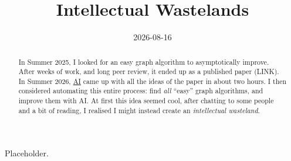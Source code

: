 \documentclass[11pt]{article}
\title{Intellectual Wastelands}
\date{2026-08-16}
\begin{document}
\begin{abstract}
In Summer 2025, I looked for an easy graph algorithm to asymptotically improve.
After weeks of work, and long peer review, it ended up as a published paper
(LINK).
In Summer 2026, \href{https://chatgpt.com/share/6a8434d4-c278-83ed-aeb1-f2f0cd1bdb62}{AI}
came up with all the ideas of the paper in about two hours. I then considered
automating this entire process: find \textit{all} ``easy'' graph algorithms,
and improve them with AI. At first this idea seemed cool, after chatting to
some people and a bit of reading, I realised I might instead create an
\textit{intellectual wasteland}.
\end{abstract}

Placeholder.
\end{document}
